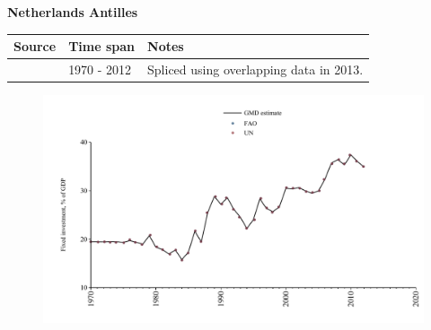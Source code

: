 \documentclass[12pt,a4paper,landscape]{article}
\begin{document}
\begin{adjustbox}{max totalsize={\paperwidth}{\paperheight},center}
\begin{minipage}[t][\textheight][t]{\textwidth}
\vspace*{0.5cm}
{}
\begin{center}
{\Large\bfseries Netherlands Antilles}
\end{center}
\vspace{0.5cm}
\begin{table}[H]
\centering
\small
\begin{tabular}{|l|l|l|}
\hline
\textbf{Source} & \textbf{Time span} & \textbf{Notes} \\
\hline
\rowcolor{white}\cite{UN}& 1970 - 2012 &Spliced using overlapping data in 2013.\\
\hline
\end{tabular}
\end{table}
\begin{figure}[H]
\centering
\includegraphics[width=\textwidth,height=0.6\textheight,keepaspectratio]{graphs/ANT_finv_GDP.pdf}
\end{figure}
\end{minipage}
\end{adjustbox}
\end{document}
